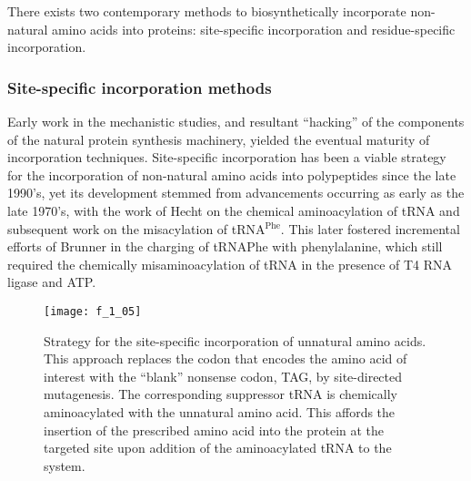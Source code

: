 \begin{refsection}
There exists two contemporary methods to biosynthetically incorporate
non-natural amino acids into proteins: site-specific incorporation and
residue-specific incorporation.

\subsubsection{Site-specific incorporation methods} 


Early work in the mechanistic studies, and resultant ``hacking'' of the
components of the natural protein synthesis machinery, yielded the eventual
maturity of incorporation techniques.  Site-specific incorporation has been a
viable strategy for the incorporation of non-natural amino acids into
polypeptides since the late 1990's, yet its development stemmed from
advancements occurring as early as the late 1970's, with the work of 
Hecht on the chemical aminoacylation of tRNA and subsequent work on the
misacylation of tRNA{$^\text{Phe}$}.\cite{Heckler1984,Hecht1978} This later
fostered incremental efforts of Brunner in the charging of tRNA{$\text{Phe}$}
with phenylalanine, which
still required the chemically misaminoacylation of tRNA in the presence of T4
RNA ligase and ATP.\cite{Baldini1988}
\begin{figure}[h!] \centering \texttt{[image: f\_1\_05]}
    \caption[Strategy for the site-specific incorporation of unnatural amino
    acids. This approach replaces the codon that encodes the amino acid of
    interest with the ``blank'' nonsense codon, TAG, by site-directed
    mutagenesis. The corresponding suppressor tRNA is chemically aminoacylated
     with the unnatural amino acid. This affords the insertion
    of the prescribed amino acid into the protein at the targeted site upon
    addition of the aminoacylated tRNA to the  system.]{Strategy for the site-specific incorporation of unnatural amino
    acids. This approach replaces the codon that encodes the amino acid of
    interest with the ``blank'' nonsense codon, TAG, by site-directed
    mutagenesis. The corresponding suppressor tRNA is chemically aminoacylated
     with the unnatural amino acid. This affords the insertion
    of the prescribed amino acid into the protein at the targeted site upon
    addition of the aminoacylated tRNA to the  system.
    \cite{Noren1989}}\label{fig:schultz_schema} \end{figure}


\end{refsection}
